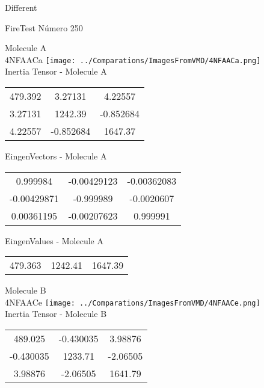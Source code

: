 \begin{center}
\vtab
\vtab
\textcolor{NavyBlue}{\Large Different}
\end{center}

 \newpage

\vtab[-2cm]
\begin{center}
{\large FireTest \tab Número 250}
\end{center}
\begin{multicols}{2}
\begin{center}

Molecule A \\ 
4NFAACa
\texttt{[image: ../Comparations/ImagesFromVMD/4NFAACa.png]}
\\
Inertia Tensor - Molecule A \\
\vtab

\begin{tabular}{|c c c|}
479.392	 & 	3.27131	 & 	4.22557	 \\
3.27131	 & 	1242.39	 & 	-0.852684	 \\
4.22557	 & 	-0.852684	 & 	1647.37
\end{tabular}

\vtab
 EingenVectors - Molecule A     \\
\vtab
\begin{tabular}{|c c c|}
0.999984	 & 	-0.00429123	 & 	-0.00362083	 \\
-0.00429871	 & 	-0.999989	 & 	-0.0020607	 \\
0.00361195	 & 	-0.00207623	 & 	0.999991
\end{tabular}

\vtab
 EingenValues - Molecule A     \\
\vtab
\begin{tabular}{|c c c|}
479.363	 & 	1242.41	 & 	1647.39	 \\
\end{tabular}
\columnbreak

Molecule B \\ 
4NFAACe
\texttt{[image: ../Comparations/ImagesFromVMD/4NFAACe.png]}
\\
Inertia Tensor - Molecule B \\
\vtab

\begin{tabular}{|c c c|}
489.025	 & 	-0.430035	 & 	3.98876	 \\
-0.430035	 & 	1233.71	 & 	-2.06505	 \\
3.98876	 & 	-2.06505	 & 	1641.79
\end{tabular}


\end{center}
\end{multicols}
